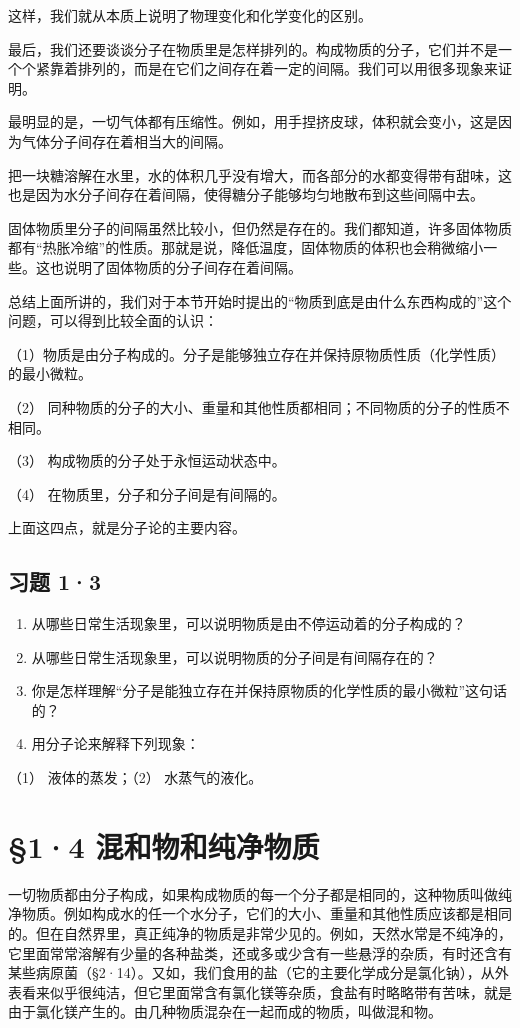 这样，我们就从本质上说明了物理变化和化学变化的区别。

最后，我们还要谈谈分子在物质里是怎样排列的。构成物质的分子，它们并不是一个个紧靠着排列的，而是在它们之间存在着一定的间隔。我们可以用很多现象来证明。

最明显的是，一切气体都有压缩性。例如，用手捏挤皮球，体积就会变小，这是因为气体分子间存在着相当大的间隔。

把一块糖溶解在水里，水的体积几乎没有增大，而各部分的水都变得带有甜味，这也是因为水分子间存在着间隔，使得糖分子能够均匀地散布到这些间隔中去。

固体物质里分子的间隔虽然比较小，但仍然是存在的。我们都知道，许多固体物质都有``热胀冷缩''的性质。那就是说，降低温度，固体物质的体积也会稍微缩小一些。这也说明了固体物质的分子间存在着间隔。

总结上面所讲的，我们对于本节开始时提出的``物质到底是由什么东西构成的''这个问题，可以得到比较全面的认识：

（1）物质是由分子构成的。分子是能够独立存在并保持原物质性质（化学性质）的最小微粒。

（2）
同种物质的分子的大小、重量和其他性质都相同；不同物质的分子的性质不相同。

（3） 构成物质的分子处于永恒运动状态中。

（4） 在物质里，分子和分子间是有间隔的。

上面这四点，就是分子论的主要内容。

\subsection{习题 1·3}

\begin{enumerate}
\item
  从哪些日常生活现象里，可以说明物质是由不停运动着的分子构成的？
\item
  从哪些日常生活现象里，可以说明物质的分子间是有间隔存在的？
\item
  你是怎样理解``分子是能独立存在并保持原物质的化学性质的最小微粒''这句话的？
\item
  用分子论来解释下列现象：
\end{enumerate}

（1） 液体的蒸发；（2） 水蒸气的液化。

\section{§1·4 混和物和纯净物质}

一切物质都由分子构成，如果构成物质的每一个分子都是相同的，这种物质叫做纯净物质。例如构成水的任一个水分子，它们的大小、重量和其他性质应该都是相同的。但在自然界里，真正纯净的物质是非常少见的。例如，天然水常是不纯净的，它里面常常溶解有少量的各种盐类，还或多或少含有一些悬浮的杂质，有时还含有某些病原菌（§2·14）。又如，我们食用的盐（它的主要化学成分是氯化钠），从外表看来似乎很纯洁，但它里面常含有氯化镁等杂质，食盐有时略略带有苦味，就是由于氯化镁产生的。由几种物质混杂在一起而成的物质，叫做混和物。

